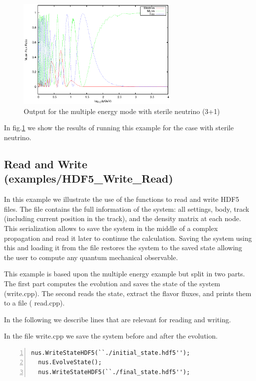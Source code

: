 \documentclass[3p,12pt]{elsarticle}
\newcommand{\ttf}{\ttfamily}
\begin{document}
\begin{figure}[h!]
  \label{fig:multimode}
  \centering
  \includegraphics[width=0.7\textwidth]{fig/Multiplot.eps} 
  \caption{Output for the multiple energy mode with sterile neutrino (3+1)} 
\end{figure}
 
In fig.\ref{fig:multimode} we show the results of running this example
for the case with sterile neutrino.

\subsection{Read and Write \textnormal{({\ttf examples/HDF5\_Write\_Read})}}
\label{sec:readwrite}
In this example we illustrate the use of the functions to
read and write {\ttf HDF5} files. The file contains the full
information of the system: all settings, body, track (including
current position in the track), and the density matrix at each node.
This serialization allows to save the system
in the middle of a complex propagation and read it later to continue
the calculation. Saving the system using this and loading it from
the file restores the system to the saved state allowing the user to
compute any quantum mechanical observable.

This example is based upon the multiple energy example but
split in two parts. The first part computes the evolution and saves the
state of the system ({\ttf write.cpp}). The second reads the
state,  extract the flavor fluxes, and  prints them to a file ({\ttf
  read.cpp}).

In the following we describe lines that are relevant for reading and writing.

In the file {\ttf write.cpp} we save the system before and after the
evolution.
\begin{lstlisting}[frame=leftline, numbers =
  left,breaklines=true,label = ex:sin1]
  nus.WriteStateHDF5(``./initial_state.hdf5'');
  nus.EvolveState();
  nus.WriteStateHDF5(``./final_state.hdf5'');
\end{lstlisting}
\end{document}

